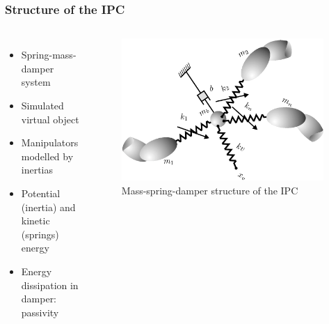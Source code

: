 \documentclass[student]{ITRslides}
\begin{document}
\begin{frame}
	\frametitle{Structure of the IPC}
\begin{columns}
			
	
		\begin{itemize}
			\item Spring-mass-damper system
			\item Simulated virtual object
			\item Manipulators modelled by inertias
			\item Potential (inertia) and kinetic (springs) energy
			\item Energy dissipation in damper: passivity
		\end{itemize}

		
             \begin{figure}[htb]
			\centering
			\includegraphics[width=0.98\textwidth]{IPCsprings.png}
			\caption{Mass-spring-damper structure of the IPC 						\cite{Stramigioli_01}}
			\end{figure}
		
			
		\end{columns}
\end{frame}
\end{document}
